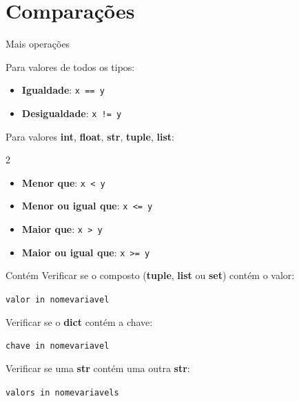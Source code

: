 


\section{Comparações}
\begin{frame}{Mais operações}
	
	Para valores de todos os tipos:
	
		\begin{itemize}
			\item \textbf{Igualdade}: 
				\texttt{x == y} 
			
			\item \textbf{Desigualdade}: 
				\texttt{x != y}
			
		\end{itemize}	
	
	\vfill
	
	Para valores \textbf{int}, \textbf{float}, \textbf{str}, \textbf{tuple}, \textbf{list}:
	
	\begin{multicols}{2}
		\begin{itemize}
			\item \textbf{Menor que}: 
				\texttt{x < y} 
			
			\item \textbf{Menor ou igual que}: 
				\texttt{x <= y}
			
			\item \textbf{Maior que}: 
				\texttt{x > y} 
			
			\item \textbf{Maior ou igual que}: 
				\texttt{x >= y}									
		\end{itemize}	
	\end{multicols}			
  \end{frame}
  
\begin{frame}{Contém} 
	Verificar se o composto (\textbf{tuple}, \textbf{list} ou \textbf{set}) contém o valor:
	
	\texttt{valor in nomevariavel}
	
\vfill	
	
	Verificar se o \textbf{dict} contém a chave:
	
	\texttt{chave in nomevariavel}
	
\vfill	
	
	Verificar se uma \textbf{str} contém uma outra \textbf{str}:
	
	\texttt{valors in nomevariavels}
  \end{frame}	

